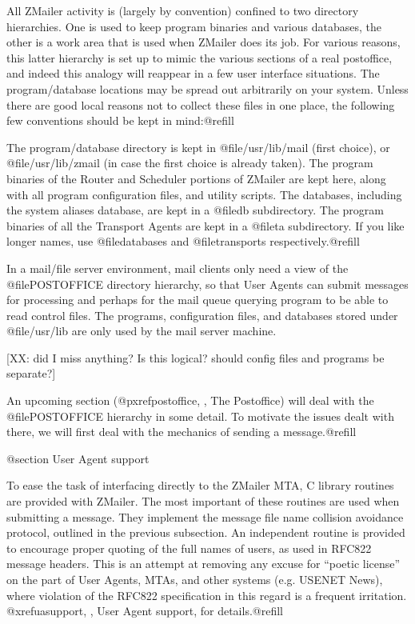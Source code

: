 All ZMailer activity is (largely by convention) confined to two directory
hierarchies.  One is used to keep program binaries and various databases, the
other is a work area that is used when ZMailer does its job.  For various
reasons, this latter hierarchy is set up to mimic the various sections of a
real postoffice, and indeed this analogy will reappear in a few user interface
situations. The program/database locations may be spread out arbitrarily on
your system. Unless there are good local reasons not to collect these files
in one place, the following few conventions should be kept in mind:@refill

The program/database directory is kept in @file{/usr/lib/mail} (first
choice), or @file{/usr/lib/zmail} (in case the first choice is already
taken).  The program binaries of the Router and Scheduler portions of
ZMailer are kept here, along with all program configuration files, and
utility scripts.  The databases, including the system aliases database,
are kept in a @file{db} subdirectory.  The program binaries of all the
Transport Agents are kept in a @file{ta} subdirectory.  If you like
longer names, use @file{databases} and @file{transports} respectively.@refill

In a mail/file server environment, mail clients only need a view of the 
@file{POSTOFFICE} directory hierarchy, so that User Agents can submit
messages for processing and perhaps for the mail queue querying program to be
able to read control files.  The programs, configuration files, and databases
stored under @file{/usr/lib} are only used by the mail server machine.

[XX: did I miss anything? Is this logical? should config files and programs
be separate?]

An upcoming section (@pxref{postoffice, , The Postoffice}) will deal with
the @file{POSTOFFICE} hierarchy in some detail. To motivate the issues dealt
with there, we will first deal with the mechanics of sending a message.@refill

@section User Agent support

To ease the task of interfacing directly to the ZMailer MTA, C library
routines are provided with ZMailer.  The most important of these routines are
used when submitting a message.  They implement the message file name collision
avoidance protocol, outlined in the previous subsection.  An independent
routine is provided to encourage proper quoting of the full names of users,
as used in RFC822 message headers.  This is an attempt at removing any excuse
for ``poetic license'' on the part of User Agents, MTAs, and other systems (e.g.
USENET News), where violation of the RFC822 specification in this regard is
a frequent irritation.  @xref{uasupport, , User Agent support}, for
details.@refill

